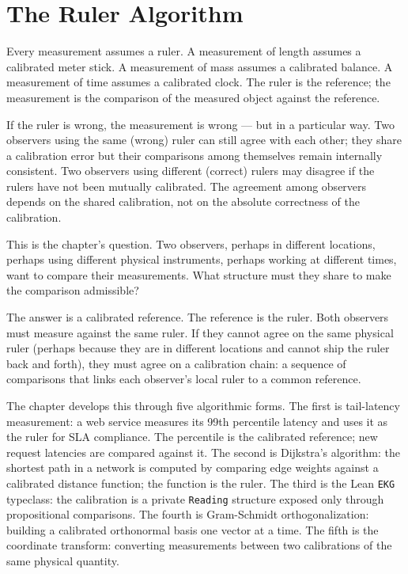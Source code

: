 \chapter{The Ruler Algorithm}
\label{chap:ruler-algorithm}


\begin{chapteressay}

Every measurement assumes a ruler. A measurement of length assumes a
calibrated meter stick. A measurement of mass assumes a calibrated
balance. A measurement of time assumes a calibrated clock. The ruler
is the reference; the measurement is the comparison of the measured
object against the reference.

If the ruler is wrong, the measurement is wrong --- but in a particular
way. Two observers using the same (wrong) ruler can still agree with
each other; they share a calibration error but their comparisons among
themselves remain internally consistent. Two observers using different
(correct) rulers may disagree if the rulers have not been mutually
calibrated. The agreement among observers depends on the shared
calibration, not on the absolute correctness of the calibration.

This is the chapter's question. Two observers, perhaps in different
locations, perhaps using different physical instruments, perhaps
working at different times, want to compare their measurements. What
structure must they share to make the comparison admissible?

The answer is a calibrated reference. The reference is the ruler. Both
observers must measure against the same ruler. If they cannot agree on
the same physical ruler (perhaps because they are in different
locations and cannot ship the ruler back and forth), they must agree on
a calibration chain: a sequence of comparisons that links each
observer's local ruler to a common reference.

The chapter develops this through five algorithmic forms. The first is
tail-latency measurement: a web service measures its 99th percentile
latency and uses it as the ruler for SLA compliance. The percentile is
the calibrated reference; new request latencies are compared against
it. The second is Dijkstra's algorithm: the shortest path in a network
is computed by comparing edge weights against a calibrated distance
function; the function is the ruler. The third is the Lean
\texttt{EKG} typeclass: the calibration is a private \texttt{Reading}
structure exposed only through propositional comparisons. The fourth
is Gram-Schmidt orthogonalization: building a calibrated orthonormal
basis one vector at a time. The fifth is the coordinate transform:
converting measurements between two calibrations of the same physical
quantity.


\end{chapteressay}
